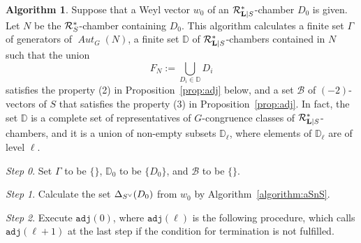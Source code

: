 \documentclass{amsart}
\theoremstyle{plain}
\theoremstyle{definition}
\newtheorem{algorithm}[theorem]{Algorithm}
\theoremstyle{remark}
\numberwithin{equation}{section}
\numberwithin{table}{section}
\numberwithin{figure}{section}
\newcommand{\step}[1]{{\it Step #1}}
\newcommand{\D}{\mathord{\mathbb D}}
\newcommand{\BBB}{\mathord{\mathcal B}}
\newcommand{\RRR}{\mathord{\mathcal R}}
\newcommand{\dual}{\sp{\vee}}
\renewcommand{\L}{\mathord{\mathbf{L}}}
\newcommand{\aut}{\operatorname{\mathit {Aut}}\nolimits}
\newcommand{\autG}{\aut_G}
\newcommand{\Chams}{\D}
\newcommand{\Roots}{\RRR}
\newcommand{\sphyp}{\sp*}
\newcommand{\procadj}{\mathord{\mathtt{adj}}}
\newcommand{\RtsLS}{\Roots_{\L|S}}
\newcommand{\Nc}{N}
\begin{document}
\begin{algorithm}\label{algo:main}
Suppose that 
a Weyl vector $w_0$ of an $\RtsLS\sphyp$-chamber $D_0$
is given.
Let $\Nc$ be the $\Roots_{S}\sphyp$-chamber containing $D_0$.
This algorithm calculates
a finite set $\varGamma$ of generators of $\autG(\Nc)$,
a finite set  $\Chams$ of $\RtsLS\sphyp$-chambers contained in $\Nc$
such that the union 
%
\begin{equation}\label{eq:FN}
F_{\Nc}:=\bigcup_{D_i\in \Chams} D_i
\end{equation}
%
satisfies the property (2) in Proposition~\ref{prop:adj} below,
and a set $\BBB$ of $(-2)$-vectors of $S$  that satisfies the property (3) in Proposition~\ref{prop:adj}.
In fact,
the set  $\Chams$ is a complete set of representatives of $G$-congruence classes
of $\RtsLS\sphyp$-chambers,
and it is a union of non-empty subsets $\Chams_{\ell}$,
where elements of $\Chams_{\ell}$ are of level $\ell$.
%
\par
\smallskip

\step{0}.
Set   $\varGamma$ to be $\{\}$,
$\Chams_0$ to be $\{D_0\}$, and $\BBB$ to be $\{\}$.

\step{1}.
Calculate the set $\Delta_{S\dual}(D_0)$ from $w_0$ by Algorithm~\ref{algorithm:aSnS}.
% 



\step{2}.
Execute $\procadj(0)$,
where $\procadj(\ell)$ is the following procedure,
which calls $\procadj(\ell+1)$ at the last step  if the condition for termination  is  not fulfilled.
%
\par
\smallskip 


\end{algorithm}
\end{document}
